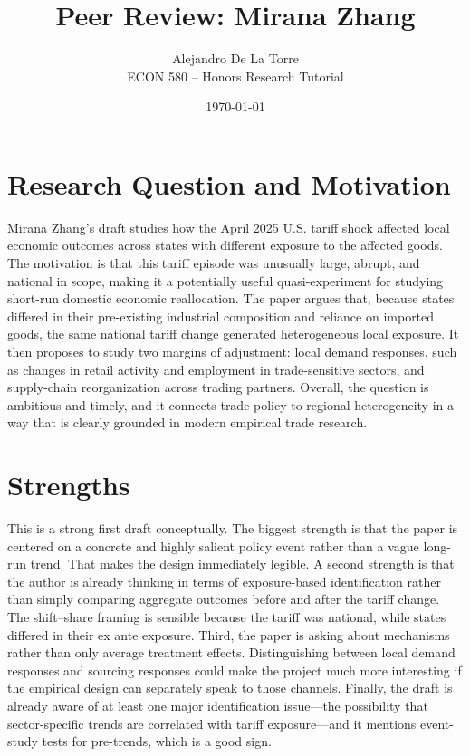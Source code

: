 \documentclass[12pt]{article}
\title{Peer Review: Mirana Zhang}
\author{Alejandro De La Torre \\
ECON 580 -- Honors Research Tutorial}
\date{\today}
\begin{document}
\maketitle

\section{Research Question and Motivation}

Mirana Zhang's draft studies how the April 2025 U.S. tariff shock affected local economic outcomes across states with different exposure to the affected goods. The motivation is that this tariff episode was unusually large, abrupt, and national in scope, making it a potentially useful quasi-experiment for studying short-run domestic economic reallocation. The paper argues that, because states differed in their pre-existing industrial composition and reliance on imported goods, the same national tariff change generated heterogeneous local exposure. It then proposes to study two margins of adjustment: local demand responses, such as changes in retail activity and employment in trade-sensitive sectors, and supply-chain reorganization across trading partners. Overall, the question is ambitious and timely, and it connects trade policy to regional heterogeneity in a way that is clearly grounded in modern empirical trade research.


\section{Strengths}

This is a strong first draft conceptually. The biggest strength is that the paper is centered on a concrete and highly salient policy event rather than a vague long-run trend. That makes the design immediately legible. A second strength is that the author is already thinking in terms of exposure-based identification rather than simply comparing aggregate outcomes before and after the tariff change. The shift--share framing is sensible because the tariff was national, while states differed in their ex ante exposure. Third, the paper is asking about mechanisms rather than only average treatment effects. Distinguishing between local demand responses and sourcing responses could make the project much more interesting if the empirical design can separately speak to those channels. Finally, the draft is already aware of at least one major identification issue---the possibility that sector-specific trends are correlated with tariff exposure---and it mentions event-study tests for pre-trends, which is a good sign.
\end{document}
